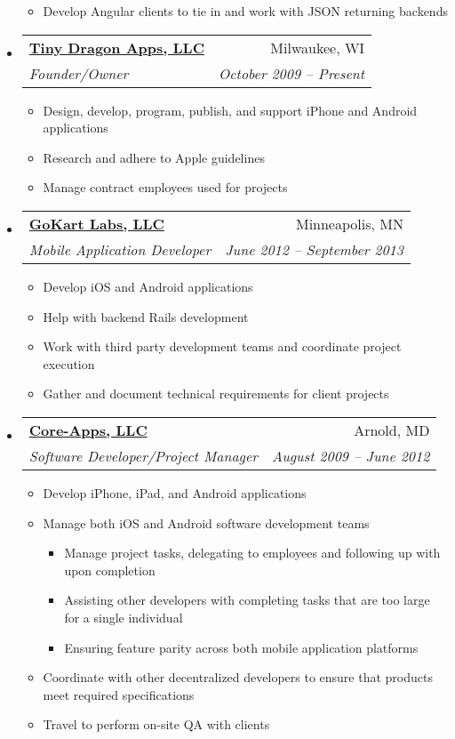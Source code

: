 \documentclass[letterpaper,12pt]{article}
\makeatletter
\newcommand{\resitem}[1]{\item #1 \vspace{-2pt}}
\newcommand{\ressubheading}[4]{
      \begin{tabular*}{6.5in}{l@{\extracolsep{\fill}}r}
        \textbf{#1} & #2 \\
        \textit{#3} & \textit{#4} \\
      \end{tabular*}\vspace{-6pt}}
\makeatother
\begin{document}
\begin{itemize}
{\begin{itemize}
            \resitem{Develop Angular clients to tie in and work with JSON returning backends}
        \end{itemize}
         }
       \item
         \ressubheading{\href{http://itunes.apple.com/WebObjects/MZStore.woa/wa/viewArtist?id=337595590}{Tiny Dragon Apps, LLC}}{Milwaukee, WI}{Founder/Owner}{October 2009 -- Present}
        { \footnotesize
        \begin{itemize}
            \resitem{Design, develop, program, publish, and support iPhone and Android applications}
            \resitem{Research and adhere to Apple guidelines}
            \resitem{Manage contract employees used for projects}
        \end{itemize}
         }
       \item
         \ressubheading{\href{http://www.gokartlabs.com}{GoKart Labs, LLC}}{Minneapolis, MN}{Mobile Application Developer}{June 2012 -- September 2013}
        { \footnotesize
        \begin{itemize}
            \resitem{Develop iOS and Android applications}
            \resitem{Help with backend Rails development}
            \resitem{Work with third party development teams and coordinate project execution}
            \resitem{Gather and document technical requirements for client projects}
        \end{itemize}
         }
       \item
         \ressubheading{\href{http://www.core-apps.com/Home.html}{Core-Apps, LLC}}{Arnold, MD}{Software Developer/Project Manager}{August 2009 -- June 2012}
        { \footnotesize
        \begin{itemize}
            \resitem{Develop iPhone, iPad, and Android applications}
            \resitem{Manage both iOS and Android software development teams}
            \begin{itemize}
                \resitem{Manage project tasks, delegating to employees and following  up with upon completion}
                \resitem{Assisting other developers with completing tasks that are too large for a single individual}
                \resitem{Ensuring feature parity across both mobile application platforms}
            \end{itemize}
            \resitem{Coordinate with other decentralized developers to ensure that products meet required specifications}
            \resitem{Travel to perform on-site QA with clients}
        \end{itemize}
}
\end{itemize}
\end{document}
